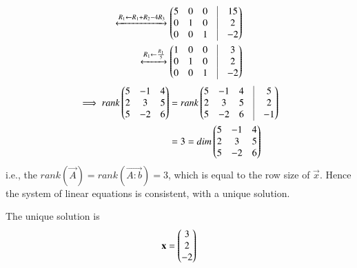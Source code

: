 \documentclass[journal,12pt,twocolumn]{IEEEtran}
\begin{document}
\begin{align}
	\xleftrightarrow[]{R_1 \leftarrow R_1+R_2-4 R_3}
	\myvec{5 & 0 &  0 &\vrule & 15 \\ 0 & 1 & 0 &\vrule & 2 \\ 0 & 0 & 1 &\vrule & -2}
	\\
	\xleftrightarrow[]{R_1 \leftarrow \frac{R_1}{5}}
	\myvec{1 & 0 &  0 &\vrule & 3 \\ 0 & 1 & 0 &\vrule & 2 \\ 0 & 0 & 1 &\vrule & -2}
\end{align}
\begin{align}
	\implies rank \myvec{ 5 & -1 & 4 \\ 2 &  3 & 5 \\ 5 & -2 & 6 }
		&=
	rank \myvec{ 5 & -1 & 4 &\vrule & 5 \\ 2 & 3 & 5 &\vrule & 2 \\ 5 & -2 & 6 &\vrule & -1}
		\nonumber \\
	&= 3 = dim \myvec{ 5 & -1 & 4 \\ 2 &  3 & 5 \\ 5 & -2 & 6 }
\end{align}
i.e., the $rank(\vec{A}) = rank(\vec{A:b}) = 3$, which is equal to the row size of $\vec{x}$. Hence the system of linear equations is consistent, with a unique solution. 

The unique solution is 
\begin{align}
	\mathbf{x} = \begin{pmatrix}3\\2\\-2\end{pmatrix}
\end{align}
\end{document}
